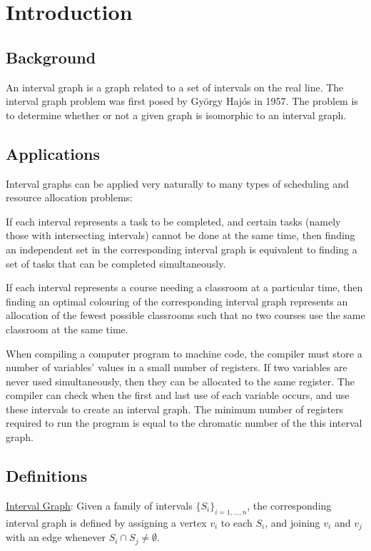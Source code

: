 \documentclass[11pt]{article}
\begin{document}
\section{Introduction}
\subsection{Background}
An interval graph is a graph related to a set of intervals on the real line.
The interval graph problem was first posed by Gy\"orgy Haj\'os in 1957.
\cite{Golumbic} The problem is to determine whether or not a given graph is
isomorphic to an interval graph.


\subsection{Applications}
Interval graphs can be applied very naturally to many types of scheduling and
resource allocation problems:

If each interval represents a task to be completed, and certain tasks (namely
those with intersecting intervals) cannot be done at the same time, then
finding an independent set in the corresponding interval graph is equivalent
to finding a set of tasks that can be completed simultaneously.

If each interval represents a course needing a classroom at a particular time,
then finding an optimal colouring of the corresponding interval graph
represents an allocation of the fewest possible classrooms such that no two
courses use the same classroom at the same time.

When compiling a computer program to machine code, the compiler must store a
number of variables' values in a small number of registers. If two variables
are never used simultaneously, then they can be allocated to the same
register.  The compiler can check when the first and last use of each variable
occurs, and use these intervals to create an interval graph. The minimum
number of registers required to run the program is equal to the chromatic
number of the this interval graph.


\subsection{Definitions}
\underline{Interval Graph}: Given a family of intervals
$\{S_i\}_{i=1,\ldots,n}$, the corresponding interval graph is defined by
assigning a vertex $v_i$ to each $S_i$, and joining $v_i$ and $v_j$ with an
edge whenever $S_i\cap S_j\neq\emptyset$.
\end{document}
